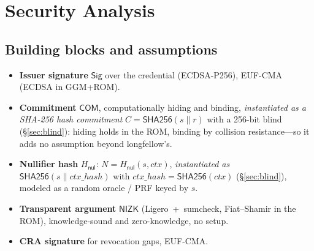 \documentclass[11pt]{article}
\theoremstyle{plain}
\theoremstyle{definition}
\begin{document}
\section{Security Analysis}\label{sec:security}

\subsection{Building blocks and assumptions}
\begin{itemize}
\item \textbf{Issuer signature} $\mathsf{Sig}$ over the credential (ECDSA-P256),
EUF-CMA (ECDSA in GGM+ROM).
\item \textbf{Commitment} $\mathsf{COM}$, computationally hiding and binding,
\emph{instantiated as a SHA-256 hash commitment} $C=\mathsf{SHA256}(s\|r)$ with a
256-bit blind (\S\ref{sec:blind}): hiding holds in the ROM, binding by collision
resistance---so it adds no assumption beyond longfellow's.
\item \textbf{Nullifier hash} $H_{\mathsf{nul}}$: $N=H_{\mathsf{nul}}(s,\mathit{ctx})$,
\emph{instantiated as} $\mathsf{SHA256}(s\|\mathit{ctx\_hash})$ with
$\mathit{ctx\_hash}=\mathsf{SHA256}(\mathit{ctx})$ (\S\ref{sec:blind}), modeled as a
random oracle / PRF keyed by $s$.
\item \textbf{Transparent argument} $\mathsf{NIZK}$ (Ligero~+~sumcheck, Fiat--Shamir
in the ROM), knowledge-sound and zero-knowledge, no setup.
\item \textbf{CRA signature} for revocation gaps, EUF-CMA.
\end{itemize}
\end{document}
